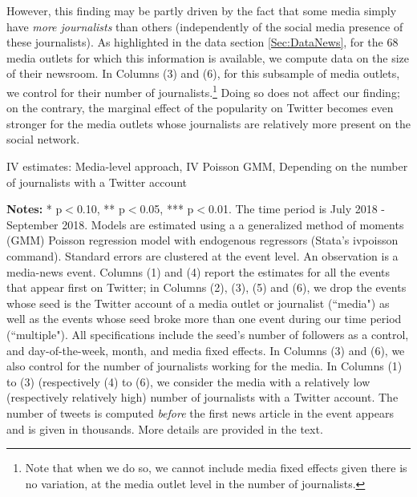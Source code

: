 However, this finding may be partly driven by the fact that some media simply have \textit{more journalists} than others (independently of the social media presence of these journalists). As highlighted in the data section \ref{Sec:DataNews}, for the $68$ media outlets for which this information is available, we compute data on the size of their newsroom. In Columns (3) and (6), for this subsample of media outlets, we control for their number of journalists.\footnote{Note that when we do so, we cannot include media fixed effects given there is no variation, at the media outlet level in the number of journalists.} Doing so does not affect our finding; on the contrary, the marginal effect of the popularity on Twitter becomes even stronger for the media outlets whose journalists are relatively more present on the social network.


\begin{table}
\caption{IV estimates: Media-level approach, IV Poisson GMM, Depending on the number of journalists with a Twitter account}
\begin{center}
	
\end{center}
\begin{spacing}{0.5}
	{\fns \textbf{Notes:} * p$<$0.10, ** p$<$0.05, *** p$<$0.01. The time period is July 2018 - September 2018. Models are estimated using a a generalized method of moments (GMM) Poisson regression model with endogenous regressors (Stata's ivpoisson command). Standard errors are clustered at the event level. An observation is a media-news event. Columns (1) and (4) report the estimates for all the events that appear first on Twitter; in Columns (2), (3), (5) and (6), we drop the events whose seed is the Twitter account of a media outlet or journalist (``media") as well as the events whose seed broke more than one event during our time period (``multiple"). All specifications include the seed's number of followers as a control, and day-of-the-week, month, and media fixed effects. In Columns (3) and (6), we also control for the number of journalists working for the media. In Columns (1) to (3) (respectively (4) to (6), we consider the media with a relatively low (respectively relatively high) number of journalists with a Twitter account. The number of tweets is computed \textit{before} the first news article in the event appears and is given in thousands. More details are provided in the text.} 
\end{spacing}
\label{Tab:regression_media_IV_Poisson_GMM_heterogeneity_nb_journalist_accounts}
\end{table} 


